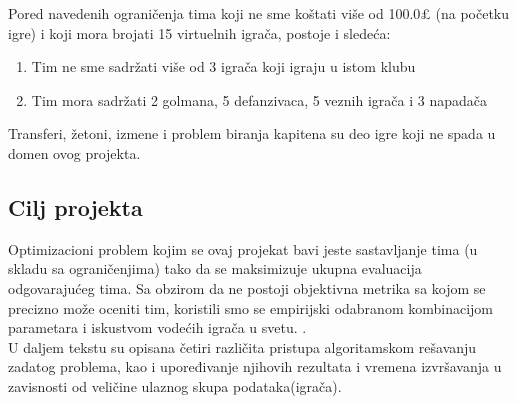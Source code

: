 \documentclass[a4paper]{article}
\begin{document}
Pored navedenih ograničenja tima koji ne sme koštati više od 100.0£ (na početku igre) i koji mora brojati 15 virtuelnih igrača, postoje i sledeća:
\begin{enumerate}
  \item Tim ne sme sadržati više od 3 igrača koji igraju u istom klubu
  \item Tim mora sadržati 2 golmana, 5 defanzivaca, 5 veznih igrača i 3 napadača
\end{enumerate} 
\vspace{5mm} %
Transferi, žetoni, izmene i problem biranja kapitena su deo igre koji ne spada u domen ovog projekta.



\subsection{Cilj projekta}
\vspace{3mm}
Optimizacioni problem kojim se ovaj projekat bavi jeste sastavljanje tima (u skladu sa ograničenjima) tako da se maksimizuje ukupna evaluacija odgovarajućeg tima. Sa obzirom da ne postoji objektivna metrika sa kojom se precizno može oceniti tim, koristili smo se empirijski odabranom kombinacijom parametara i iskustvom vodećih igrača u svetu.  \cite{FPLExpert}. \\

U daljem tekstu su opisana četiri različita pristupa algoritamskom rešavanju zadatog problema, kao i upoređivanje njihovih rezultata i vremena izvršavanja u zavisnosti od veličine ulaznog skupa podataka(igrača).

\vspace{5mm} 




\end{document}
